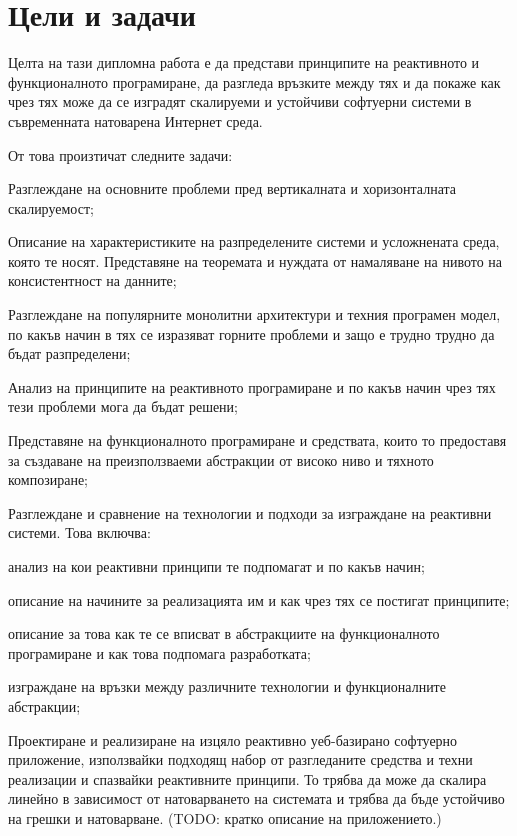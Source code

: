 \section{Цели и задачи}

Целта на тази дипломна работа е да представи принципите на реактивното и функционалното програмиране, да разгледа връзките между тях и да покаже как чрез тях може да се изградят скалируеми и устойчиви софтуерни системи в съвременната натоварена Интернет среда.

От това произтичат следните задачи:
\begin{itemize*}
  \item Разглеждане на основните проблеми пред вертикалната и хоризонталната скалируемост;
  \item Описание на характеристиките на разпределените системи и усложнената среда, която те носят. Представяне на  теоремата и нуждата от намаляване на нивото на консистентност на данните;
  \item Разглеждане на популярните монолитни архитектури и техния програмен модел, по какъв начин в тях се изразяват горните проблеми и защо е трудно трудно да бъдат разпределени;
  \item Анализ на принципите на реактивното програмиране и по какъв начин чрез тях тези проблеми мога да бъдат решени;
  \item Представяне на функционалното програмиране и средствата, които то предоставя за създаване на преизползваеми абстракции от високо ниво и тяхното композиране;
  \item Разглеждане и сравнение на технологии и подходи за изграждане на реактивни системи. Това включва:
  \begin{itemize*}
    \item анализ на кои реактивни принципи те подпомагат и по какъв начин;
    \item описание на начините за реализацията им и как чрез тях се постигат принципите;
    \item описание за това как те се вписват в абстракциите на функционалното програмиране и как това подпомага разработката;
    \item изграждане на връзки между различните технологии и функционалните абстракции;
  \end{itemize*}
  \item Проектиране и реализиране на изцяло реактивно уеб-базирано софтуерно приложение, използвайки подходящ набор от разгледаните средства и техни реализации и спазвайки реактивните принципи. То трябва да може да скалира линейно в зависимост от натоварването на системата и трябва да бъде устойчиво на грешки и натоварване. (TODO: кратко описание на приложението.)

\end{itemize*}
